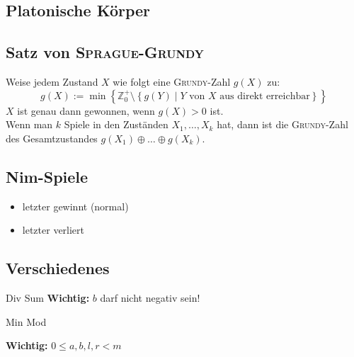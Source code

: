\subsection{Platonische Körper}




\subsection{Satz von \textsc{Sprague-Grundy}}
Weise jedem Zustand $X$ wie folgt eine \textsc{Grundy}-Zahl $g\left(X\right)$ zu:
\[
g\left(X\right) := \min\left\{
\mathbb{Z}_0^+ \setminus
\left\{g\left(Y\right) \mid Y \text{ von } X \text{ aus direkt erreichbar}\right\}
\right\}
\]
$X$ ist genau dann gewonnen, wenn $g\left(X\right) > 0$ ist.\\
Wenn man $k$ Spiele in den Zuständen $X_1, \ldots, X_k$ hat, dann ist die \textsc{Grundy}-Zahl des Gesamtzustandes $g\left(X_1\right) \oplus \ldots \oplus g\left(X_k\right)$.

\subsection{Nim-Spiele}
\begin{itemize}
	\item[\ding{182}] letzter gewinnt (normal)
	\item[\ding{183}] letzter verliert
\end{itemize}


\subsection{Verschiedenes}


\begin{algorithm}{Div Sum}
	\textbf{Wichtig:} $b$ darf nicht negativ sein!
\end{algorithm}

\begin{algorithm}{Min Mod}
	\begin{methods}
		\method{minMod}{berechnet das Minimum von $(a \cdot i + b) \bmod{m}$ für $i \in [0, n)$}{\log(m)}
	\end{methods}
	\textbf{Wichtig:} $0 \leq a, b, l, r < m$
\end{algorithm}

